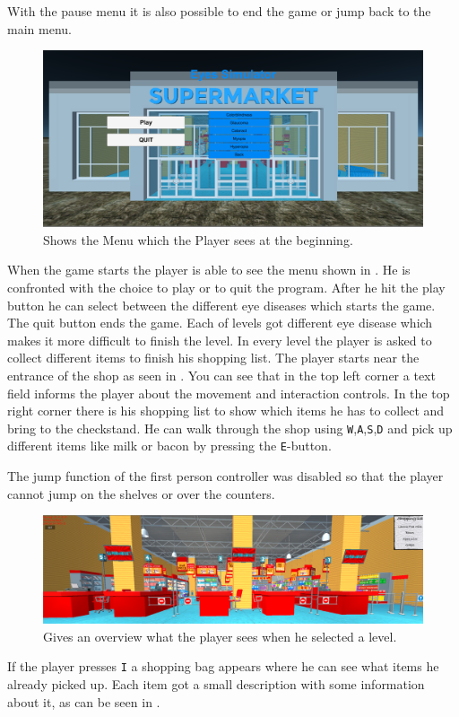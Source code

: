 \documentclass{sig-alternate-05-2015}
\begin{document}
With the pause menu it is also possible to end the game or jump back to the main menu.
%
\begin{figure}
    \centering
    \includegraphics[width=\columnwidth]{Menu.png}
    \caption{Shows the Menu which the Player sees at the beginning.}
    \label{fig:menu}
\end{figure}
%
When the game starts the player is able to see the menu shown in .
He is confronted with the choice to play or to quit the program.
After he hit the play button he can select between the different eye diseases which starts the game.
The quit button ends the game.
Each of levels got different eye disease which makes it more difficult to finish the level.
In every level the player is asked to collect different items to finish his shopping list.
The player starts near the entrance of the shop as seen in .
You can see that in the top left corner a text field informs the player about the movement and interaction controls.
In the top right corner there is his shopping list to show which items he has to collect and bring to the checkstand.
He can walk through the shop using \texttt{W},\texttt{A},\texttt{S},\texttt{D} and pick up different items like milk or bacon by pressing the \texttt{E}-button. 

The jump function of the first person controller was disabled so that the player cannot jump on the shelves or over the counters.
%
\begin{figure}
    \centering
    \includegraphics[width=\columnwidth]{Game.png}
    \caption{Gives an overview what the player sees when he selected a level.}
    \label{fig:gamestart}
\end{figure}
%
If the player presses \texttt{I} a shopping bag appears where he can see what items he already picked up.
Each item got a small description with some information about it, as can be seen in . 
\end{document}
